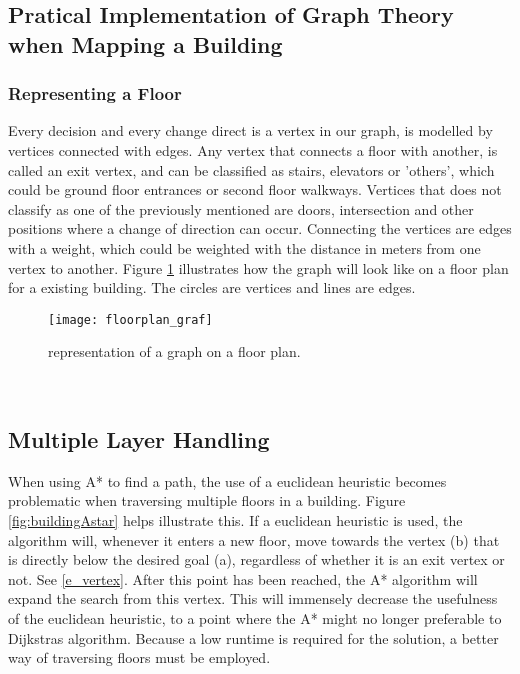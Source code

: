 \subsection{Pratical Implementation of Graph Theory when Mapping a Building}

\subsubsection{Representing a Floor}

Every decision and every change direct is a vertex in our graph, is modelled by vertices connected with edges. \label{e_vertex} Any vertex that connects a floor with another, is called an exit vertex, and can be classified as stairs, elevators or 'others', which could be ground floor entrances or second floor walkways. Vertices that does not classify as one of the previously mentioned are doors, intersection and other positions where a change of direction can occur. Connecting the vertices are edges with a weight, which could be weighted with the distance in meters from one vertex to another. Figure \ref{fig:floorplan_graf} illustrates how the graph will look like on a floor plan for a existing building. The circles are vertices and lines are edges.

\begin{figure}[ht!]
    \centering
    \texttt{[image: floorplan\_graf]}
    \caption{representation of a graph on a floor plan.}
    \label{fig:floorplan_graf}
  \end{figure}
\
\subsection{Multiple Layer Handling} \label{multlayhan}

When using A* to find a path, the use of a euclidean heuristic becomes problematic when traversing multiple floors in a building. Figure \ref{fig:buildingAstar} helps illustrate this. If a euclidean heuristic is used, the algorithm will, whenever it enters a new floor, move towards the vertex (b) that is directly below the desired goal (a), regardless of whether it is an exit vertex or not. See \cref{e_vertex}. After this point has been reached, the A* algorithm will expand the search from this vertex. This will immensely decrease the usefulness of the euclidean heuristic, to a point where the A* might no longer preferable to Dijkstras algorithm. Because a low runtime is required for the solution, a better way of traversing floors must be employed.

